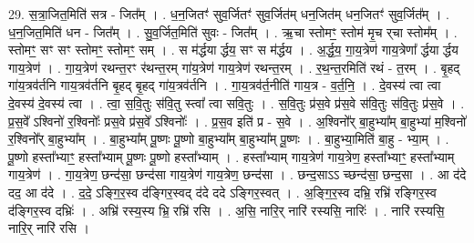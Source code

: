 \documentclass[17pt]{extarticle}
\begin{document}
29. स॒त्रा॒जित॒मिति॑ सत्र - जित᳚म् । . ध॒न॒जितꣳ॑ सुव॒र्जितꣳ॑ सुव॒र्जित॑म् धन॒जित॑म् धन॒जितꣳ॑ सुव॒र्जित᳚म् । . ध॒न॒जित॒मिति॑ धन - जित᳚म् । . सु॒व॒र्जित॒मिति॑ सुवः - जित᳚म् । . ऋ॒चा स्तोमꣳ॒॒ स्तोम॑ मृ॒च र्‌चा स्तोम᳚म् । . स्तोमꣳ॒॒ सꣳ सꣳ स्तोमꣳ॒॒ स्तोमꣳ॒॒ सम् । . स म॑र्द्धया र्द्धय॒ सꣳ स म॑र्द्धय । . अ॒र्द्ध॒य॒ गा॒य॒त्रेण॑ गाय॒त्रेणा᳚ र्द्धया र्द्धय गाय॒त्रेण॑ । . गा॒य॒त्रेण॑ रथन्त॒रꣳ र॑थन्त॒रम् गा॑य॒त्रेण॑ गाय॒त्रेण॑ रथन्त॒रम् । . र॒थ॒न्त॒रमिति॑ रथं - त॒रम् । . बृ॒हद् गा॑य॒त्रव॑र्तनि गाय॒त्रव॑र्तनि बृ॒हद् बृ॒हद् गा॑य॒त्रव॑र्तनि । . गा॒य॒त्रव॑र्त॒नीति॑ गाय॒त्र - व॒र्त॒नि॒ । . दे॒वस्य॑ त्वा त्वा दे॒वस्य॑ दे॒वस्य॑ त्वा । . त्वा॒ स॒वि॒तुः स॑वि॒तु स्त्वा᳚ त्वा सवि॒तुः । . स॒वि॒तुः प्र॑स॒वे प्र॑स॒वे स॑वि॒तुः स॑वि॒तुः प्र॑स॒वे । . प्र॒स॒वे᳚ ऽश्विनो॑ र॒श्विनोः᳚ प्रस॒वे प्र॑स॒वे᳚ ऽश्विनोः᳚ । . प्र॒स॒व इति॑ प्र - स॒वे । . अ॒श्विनो᳚र् बा॒हुभ्या᳚म् बा॒हुभ्या॑ म॒श्विनो॑ र॒श्विनो᳚र् बा॒हुभ्या᳚म् । . बा॒हुभ्या᳚म् पू॒ष्णः पू॒ष्णो बा॒हुभ्या᳚म् बा॒हुभ्या᳚म् पू॒ष्णः । . बा॒हुभ्या॒मिति॑ बा॒हु - भ्या॒म् । . पू॒ष्णो हस्ता᳚भ्याꣳ॒॒ हस्ता᳚भ्याम् पू॒ष्णः पू॒ष्णो हस्ता᳚भ्याम् । . हस्ता᳚भ्याम् गाय॒त्रेण॑ गाय॒त्रेण॒ हस्ता᳚भ्याꣳ॒॒ हस्ता᳚भ्याम् गाय॒त्रेण॑ । . गा॒य॒त्रेण॒ छन्द॑सा॒ छन्द॑सा गाय॒त्रेण॑ गाय॒त्रेण॒ छन्द॑सा । . छन्द॒साऽऽ च्छन्द॑सा॒ छन्द॒सा । . आ द॑दे दद॒ आ द॑दे । . द॒दे॒ ऽङ्गि॒र॒स्व द॑ङ्गिर॒स्वद् द॑दे ददे ऽङ्गिर॒स्वत् । . अ॒ङ्गि॒र॒स्व दभ्रि॒ रभ्रि॑ रङ्गिर॒स्व द॑ङ्गिर॒स्व दभ्रिः॑ । . अभ्रि॑ रस्य॒स्य भ्रि॒ रभ्रि॑ रसि । . अ॒सि॒ नारि॒र् नारि॑ रस्यसि॒ नारिः॑ । . नारि॑ रस्यसि॒ नारि॒र् नारि॑ रसि । \newline
\end{document}
